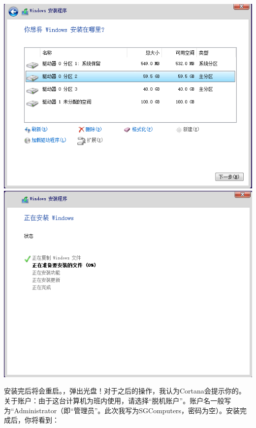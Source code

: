 \begin{center}
	\includegraphics[scale=0.22]{pic/win10setup6}	\includegraphics[scale=0.22]{pic/win10setup7}
\end{center} \par
安装完后将会重启。{\color{red}，弹出光盘！}对于之后的操作，我认为Cortana会提示你的。关于账户：由于这台计算机为班内使用，请选择“脱机账户”。账户名一般写为“Administrator（即“管理员”。此次我写为SGComputers，密码为空）。安装完成后，你将看到：
